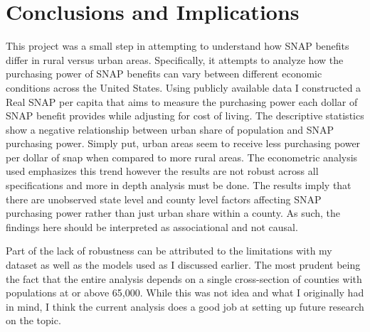 \documentclass{article}
\begin{document}
\section{Conclusions and Implications}

This project was a small step in attempting to understand how SNAP benefits differ in rural versus urban areas. Specifically, it attempts to analyze how the purchasing power of SNAP benefits can vary between different economic conditions across the United States. Using publicly available data I constructed a Real SNAP per capita that aims to measure the purchasing power each dollar of SNAP benefit provides while adjusting for cost of living. The descriptive statistics show a negative relationship between urban share of population and SNAP purchasing power. Simply put, urban areas seem to receive less purchasing power per dollar of snap when compared to more rural areas. 
The econometric analysis used emphasizes this trend however the results are not robust across all specifications and more in depth analysis must be done. The results imply that there are unobserved state level and county level factors affecting SNAP purchasing power rather than just urban share within a county. As such, the findings here should be interpreted as associational and not causal.

Part of the lack of robustness can be attributed to the limitations with my dataset as well as the models used as I discussed earlier. The most prudent being the fact that the entire analysis depends on a single cross-section of counties with populations at or above 65,000. While this was not idea and what I originally had in mind, I think the current analysis does a good job at setting up future research on the topic. 
\end{document}
